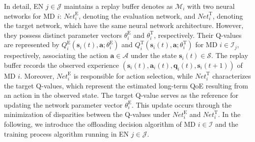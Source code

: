 \documentclass[12pt,draftclsnofoot,onecolumn]{IEEEtran}
\begin{document}
In detail, EN $j \in \mathcal{J}$ maintains a replay buffer denotes as $\mathcal{M}_i$ with two neural networks for MD $i$: $\textit{Net}_i^{\text{E}}$, denoting the evaluation network, and $\textit{Net}_i^{\text{T}}$, denoting the target network, which have the same neural network architecture. However, they possess distinct parameter vectors $\theta^{\text{E}}_i$ and $\theta^{\text{T}}_i$, respectively. Their Q-values are represented by $Q_i^{\text{E}}(\boldsymbol{s}_i(t), \boldsymbol{a}; \theta^{\text{E}}_i)$ and $Q_i^{\text{T}}(\boldsymbol{s}_i(t), \boldsymbol{a}; \theta^{\text{T}}_i)$ for MD $i \in \mathcal{I}_j$, respectively, associating the action $\boldsymbol{a} \in \mathcal{A}$ under the state $\boldsymbol{s}_i(t) \in \mathcal{S}$. The replay buffer records the observed experience $(\boldsymbol{s}_i(t), \boldsymbol{a}_i(t), \boldsymbol{q}_i(t), \boldsymbol{s}_i(t+1))$ of MD $i$. Moreover, $\textit{Net}_i^{\text{E}}$ is responsible for action selection, while $\textit{Net}_i^{\text{T}}$ characterizes the target Q-values, which represent the estimated long-term QoE resulting from an action in the observed state. The target Q-value serves as the reference for updating the network parameter vector $\theta^{\text{E}}_i$. This update occurs through the minimization of disparities between the Q-values under $\textit{Net}_i^{\text{E}}$ and $\textit{Net}_i^{\text{T}}$. In the following, we introduce the offloading decision algorithm of MD $i \in \mathcal{I}$ and the training process algorithm running in EN $j \in \mathcal{J}$.

\end{document}
